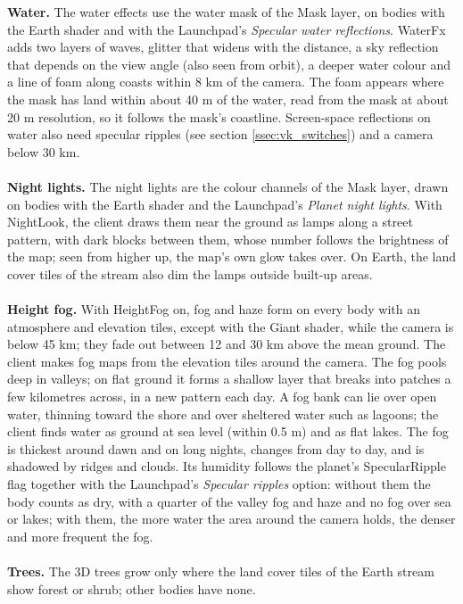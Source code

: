 \documentclass[Orbiter Developer Manual.tex]{subfiles}
\begin{document}
\begin{sloppypar}
\noindent
\textbf{Water.} The water effects use the water mask of the Mask layer, on bodies with the Earth shader and with the Launchpad's \textit{Specular water reflections}. WaterFx adds two layers of waves, glitter that widens with the distance, a sky reflection that depends on the view angle (also seen from orbit), a deeper water colour and a line of foam along coasts within 8 km of the camera. The foam appears where the mask has land within about 40 m of the water, read from the mask at about 20 m resolution, so it follows the mask's coastline. Screen-space reflections on water also need specular ripples (see section \ref{ssec:vk_switches}) and a camera below 30 km.\\
\\
\textbf{Night lights.} The night lights are the colour channels of the Mask layer, drawn on bodies with the Earth shader and the Launchpad's \textit{Planet night lights}. With NightLook, the client draws them near the ground as lamps along a street pattern, with dark blocks between them, whose number follows the brightness of the map; seen from higher up, the map's own glow takes over. On Earth, the land cover tiles of the stream also dim the lamps outside built-up areas.\\
\\
\textbf{Height fog.} With HeightFog on, fog and haze form on every body with an atmosphere and elevation tiles, except with the Giant shader, while the camera is below 45 km; they fade out between 12 and 30 km above the mean ground. The client makes fog maps from the elevation tiles around the camera. The fog pools deep in valleys; on flat ground it forms a shallow layer that breaks into patches a few kilometres across, in a new pattern each day. A fog bank can lie over open water, thinning toward the shore and over sheltered water such as lagoons; the client finds water as ground at sea level (within 0.5 m) and as flat lakes. The fog is thickest around dawn and on long nights, changes from day to day, and is shadowed by ridges and clouds. Its humidity follows the planet's SpecularRipple flag together with the Launchpad's \textit{Specular ripples} option: without them the body counts as dry, with a quarter of the valley fog and haze and no fog over sea or lakes; with them, the more water the area around the camera holds, the denser and more frequent the fog.\\
\\
\textbf{Trees.} The 3D trees grow only where the land cover tiles of the Earth stream show forest or shrub; other bodies have none.



\end{sloppypar}
\end{document}
